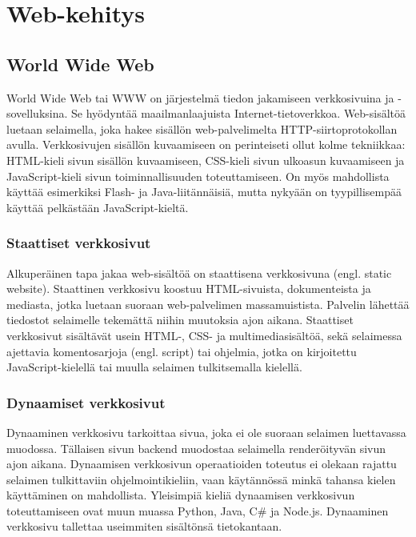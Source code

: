 \chapter{Web-kehitys}

\section{World Wide Web}
World Wide Web tai WWW on järjestelmä tiedon jakamiseen verkkosivuina ja -sovelluksina. Se hyödyntää maailmanlaajuista
Internet-tietoverkkoa. Web-sisältöä luetaan selaimella, joka hakee sisällön web-palvelimelta HTTP-siirtoprotokollan
avulla. Verkkosivujen sisällön kuvaamiseen on perinteiseti ollut kolme tekniikkaa: HTML-kieli sivun sisällön
kuvaamiseen, CSS-kieli sivun ulkoasun kuvaamiseen ja JavaScript-kieli sivun toiminnallisuuden toteuttamiseen. On myös
mahdollista käyttää esimerkiksi Flash- ja Java-liitännäisiä, mutta nykyään on tyypillisempää käyttää pelkästään
JavaScript-kieltä. \cite{javascriptguide}

\subsection{Staattiset verkkosivut}
Alkuperäinen tapa jakaa web-sisältöä on staattisena verkkosivuna (engl. static website). Staattinen verkkosivu koostuu
HTML-sivuista, dokumenteista ja mediasta, jotka luetaan suoraan web-palvelimen massamuistista. Palvelin lähettää
tiedostot selaimelle tekemättä niihin muutoksia ajon aikana. Staattiset verkkosivut sisältävät usein HTML-, CSS- ja
multimediasisältöä, sekä selaimessa ajettavia komentosarjoja (engl. script) tai ohjelmia, jotka on kirjoitettu
JavaScript-kielellä tai muulla selaimen tulkitsemalla kielellä. \cite{staticdynamicwebsites}

\subsection{Dynaamiset verkkosivut}
Dynaaminen verkkosivu tarkoittaa sivua, joka ei ole suoraan selaimen luettavassa muodossa. Tällaisen sivun backend
muodostaa selaimella renderöityvän sivun ajon aikana. Dynaamisen verkkosivun operaatioiden toteutus ei olekaan rajattu
selaimen tulkittaviin ohjelmointikieliin, vaan käytännössä minkä tahansa kielen käyttäminen on mahdollista. Yleisimpiä
kieliä dynaamisen verkkosivun toteuttamiseen ovat muun muassa Python, Java, C\# ja Node.js. Dynaaminen verkkosivu
tallettaa useimmiten sisältönsä tietokantaan. \cite{staticdynamicwebsites}

